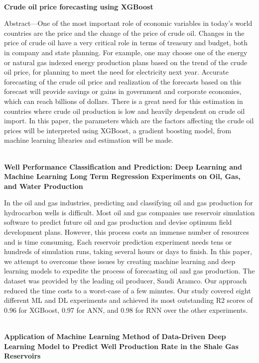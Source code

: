 \\
\textbf{Crude oil price forecasting using XGBoost}

Abstract—One of the most important role of economic
variables in today's world countries are the price and the change
of the price of crude oil. Changes in the price of crude oil have a
very critical role in terms of treasury and budget, both in
company and state planning. For example, one may choose one of
the energy or natural gas indexed energy production plans based
on the trend of the crude oil price, for planning to meet the need
for electricity next year. Accurate forecasting of the crude oil
price and realization of the forecasts based on this forecast will
provide savings or gains in government and corporate economies,
which can reach billions of dollars. There is a great need for this
estimation in countries where crude oil production is low and
heavily dependent on crude oil import. In this paper, the
parameters which are the factors affecting the crude oil prices
will be interpreted using XGBoost, a gradient boosting model,
from machine learning libraries and estimation will be made.

\\
\textbf{Well Performance Classification and Prediction: Deep Learning and Machine Learning Long Term Regression Experiments on Oil, Gas, and Water Production}

In the oil and gas industries, predicting and classifying oil and gas production for hydrocarbon wells is difficult. Most oil and gas companies use reservoir simulation software to predict future
oil and gas production and devise optimum field development plans. However, this process costs an
immense number of resources and is time consuming. Each reservoir prediction experiment needs
tens or hundreds of simulation runs, taking several hours or days to finish. In this paper, we attempt
to overcome these issues by creating machine learning and deep learning models to expedite the
process of forecasting oil and gas production. The dataset was provided by the leading oil producer,
Saudi Aramco. Our approach reduced the time costs to a worst-case of a few minutes. Our study
covered eight different ML and DL experiments and achieved its most outstanding R2 scores of 0.96
for XGBoost, 0.97 for ANN, and 0.98 for RNN over the other experiments.

\\

\textbf{Application of Machine Learning Method of Data-Driven Deep Learning Model to Predict Well Production Rate in the Shale Gas Reservoirs}

